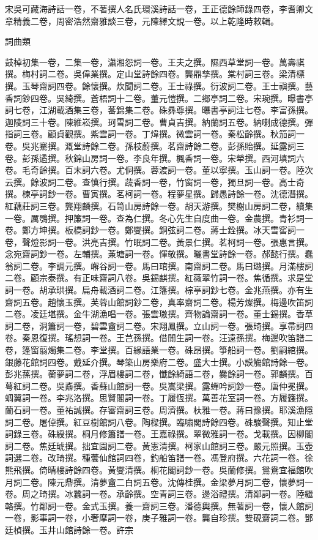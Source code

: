 \begin{pinyinscope}
宋吳可藏海詩話一卷，不著撰人名氏環溪詩話一卷，王正德餘師錄四卷，李耆卿文章精義二卷，周密浩然齋雅談三卷，元陳繹文說一卷。以上乾隆時敕輯。

詞曲類

鼓棹初集一卷，二集一卷，瀟湘怨詞一卷。王夫之撰。隰西草堂詞一卷。萬壽祺撰。梅村詞二卷。吳偉業撰。定山堂詩餘四卷。龔鼎孳撰。棠村詞三卷。梁清標撰。玉琴齋詞四卷。餘懷撰。炊聞詞二卷。王士祿撰。衍波詞二卷。王士禛撰。藝香詞鈔四卷。吳綺撰。蒼梧詞十二卷。董元愷撰。二鄉亭詞二卷。宋琬撰。曝書亭詞七卷，江湖載酒集三卷，蕃錦集二卷。硃彞尊撰。曝書亭詞注七卷。李富孫撰。迦陵詞三十卷。陳維崧撰。珂雪詞二卷。曹貞吉撰。納蘭詞五卷。納喇成德撰。彈指詞三卷。顧貞觀撰。紫雲詞一卷。丁煒撰。微雲詞一卷。秦松齡撰。秋笳詞一卷。吳兆騫撰。溉堂詩餘二卷。孫枝蔚撰。茗齋詩餘二卷。彭孫貽撰。延露詞三卷。彭孫遹撰。秋錦山房詞一卷。李良年撰。楓香詞一卷。宋犖撰。西河填詞六卷。毛奇齡撰。百末詞六卷。尤侗撰。蓉渡詞一卷。董以寧撰。玉山詞一卷。陸次云撰。餘波詞二卷。查慎行撰。蔬香詞一卷，竹窗詞一卷，獨旦詞一卷。高士奇撰。楝亭詞鈔一卷。曹寅撰。茗柯詞一卷。程夢星撰。歸愚詩餘一卷。沈德潛撰。紅藕莊詞三卷。龔翔麟撰。石笥山房詩餘一卷。胡天游撰。樊榭山房詞二卷，續集一卷。厲鶚撰。押簾詞一卷。查為仁撰。冬心先生自度曲一卷。金農撰。青衫詞一卷。鄭方坤撰。板橋詞鈔一卷。鄭燮撰。銅弦詞二卷。蔣士銓撰。冰天雪窖詞一卷，聲燈影詞一卷。洪亮吉撰。竹眠詞二卷。黃景仁撰。茗柯詞一卷。張惠言撰。念宛齋詞鈔一卷。左輔撰。蒹塘詞一卷。惲敬撰。曬書堂詩餘一卷。郝懿行撰。蠢翁詞二卷。李調元撰。嶰谷詞一卷。馬曰琯撰。南齋詞二卷。馬曰璐撰。月滿樓詞二卷。顧宗泰撰。有正味齋詞八卷。吳錫麒撰。紅薇翠竹詞一卷。焦循撰。求是堂詞一卷。胡承珙撰。扁舟載酒詞二卷。江籓撰。棕亭詞鈔七卷。金兆燕撰。亦有生齋詞五卷。趙懷玉撰。芙蓉山館詞鈔二卷，真率齋詞二卷。楊芳燦撰。梅邊吹笛詞二卷。凌廷堪撰。金牛湖漁唱一卷。張雲璈撰。齊物論齋詞一卷。董士錫撰。香草詞二卷，洞簫詞一卷，碧雲盦詞二卷。宋翔鳳撰。立山詞一卷。張琦撰。享帚詞四卷。秦恩復撰。瑤想詞一卷。王芑孫撰。借閒生詞一卷。汪遠孫撰。梅邊吹笛譜二卷，篷窗翦燭集二卷。李堂撰。百緣語業一卷。硃昂撰。箏船詞一卷。劉嗣綰撰。銀藤花館詞四卷。戴延介撰。琴築山房樂府二卷。盛大士撰。小謨觴館詩餘一卷。彭兆蓀撰。蘅夢詞二卷，浮眉樓詞二卷，懺餘綺語二卷，爨餘詞一卷。郭麟撰。百萼紅詞二卷。吳鼒撰。香蘇山館詞一卷。吳嵩梁撰。露蟬吟詞鈔一卷。唐仲冕撰。蜩翼詞一卷。李兆洛撰。思賢閣詞一卷。丁履恆撰。萬善花室詞一卷。方履籛撰。蘭石詞一卷。董祐誠撰。存審齋詞三卷。周濟撰。杕雅一卷。蔣曰豫撰。耶溪漁隱詞二卷。屠倬撰。紅豆樹館詞八卷。陶樑撰。臨嘯閣詩餘四卷。硃駿聲撰。知止堂詞錄三卷。硃綬撰。桐月修簫譜一卷。王嘉祿撰。翠微雅詞一卷。戈載撰。因柳閣詞二卷。焦廷琥撰。拙宜園詞二卷。黃憲清撰。柯家山館詞三卷。嚴元照撰。玉壺詞選二卷。改琦撰。種蕓仙館詞四卷，釣船笛譜一卷。馮登府撰。六花詞一卷。徐熊飛撰。倚晴樓詩餘四卷。黃燮清撰。桐花閣詞鈔一卷。吳蘭修撰。鴛鴦宜福館吹月詞二卷。陳元鼎撰。清夢盦二白詞五卷。沈傳桂撰。金梁夢月詞二卷，懷夢詞一卷。周之琦撰。冰蠶詞一卷。承齡撰。空青詞三卷。邊浴禮撰。清鄰詞一卷。陸繼輅撰。竹鄰詞一卷。金式玉撰。養一齋詞三卷。潘德輿撰。無著詞一卷，懷人館詞一卷，影事詞一卷，小奢摩詞一卷，庚子雅詞一卷。龔自珍撰。雙硯齋詞二卷。鄧廷楨撰。玉井山館詩餘一卷。許宗
\end{pinyinscope}
